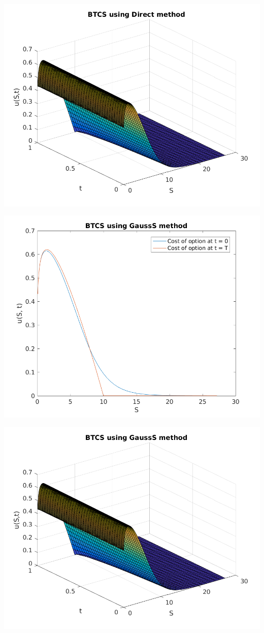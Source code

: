 \documentclass{article}
\begin{document}
\includegraphics{"q2_4"}
\pagebreak


\includegraphics{"q2_5"}
\pagebreak


\includegraphics{"q2_6"}
\pagebreak
\end{document}
